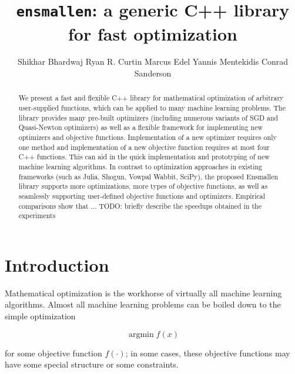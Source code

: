 \documentclass{article}
\begin{document}
\title{\texttt{ensmallen}: a generic C++ library for fast optimization}

\author{Shikhar Bhardwaj \And Ryan R. Curtin \And Marcus Edel \And Yannis
Mentekidis \And Conrad Sanderson}

\maketitle

\begin{abstract}


We present a fast and flexible C++ library for mathematical optimization of 
arbitrary user-supplied functions,
which can be applied to many machine learning problems.
The library provides many pre-built optimizers
(including numerous variants of SGD and Quasi-Newton optimizers)
as well as a flexible framework for implementing new optimizers and objective functions.
Implementation of a new optimizer requires only one method
and implementation of a new objective function requires at most four C++ functions. 
This can aid in the  quick implementation and prototyping of new machine learning algorithms.
In contrast to optimization approaches in existing frameworks
(such as Julia, Shogun, Vowpal Wabbit, SciPy),
the proposed Ensmallen library supports more optimizations,
more types of objective functions,
as well as seamlessly supporting user-defined objective functions and optimizers.
Empirical comparisons show that ...
TODO: briefly describe the speedups obtained in the experiments


\end{abstract}

\section{Introduction}

Mathematical optimization is the workhorse of virtually all machine learning
algorithms.  Almost all machine learning problems can be boiled down to the
simple optimization

\begin{equation}
\operatorname{argmin} f(x)
\end{equation}

\noindent for some objective function $f(\cdot)$; in some cases, these objective
functions may have some special structure or some constraints.
\end{document}
